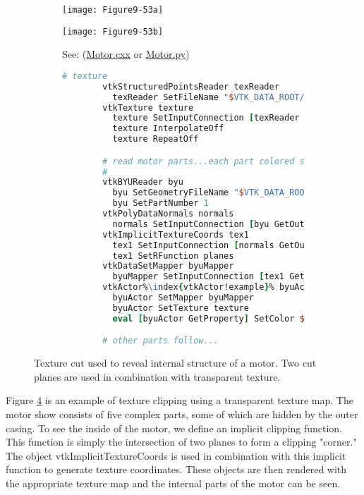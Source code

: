 \begin{figure}[htb]
    \centering
	\begin{subfigure}[h]{0.38\linewidth}
		\texttt{[image: Figure9-53a]}
		\captionsetup{justification=centering}
		\caption*{}
		\label{fig:Figure9-53a}
	\end{subfigure}
	\hfill
	\begin{subfigure}[h]{0.38\linewidth}
		\texttt{[image: Figure9-53b]}
		\captionsetup{justification=centering}
		\caption*{See: (\href{https://lorensen.github.io/VTKExamples/site/Cxx/VisualizationAlgorithms/Motor/}{Motor.cxx} or \href{https://lorensen.github.io/VTKExamples/site/Python/VisualizationAlgorithms/Motor/}{Motor.py})}
        \label{fig:Figure9-53b}
	\end{subfigure}
	\hfill
	\begin{subfigure}[h]{0.76\linewidth}
        \begin{lstlisting}[language=TCL,  caption={}, numbers=none, frame=none, escapechar=\%]
        # texture
        vtkStructuredPointsReader texReader
          texReader SetFileName "$VTK_DATA_ROOT/Data/texThres2.vtk"
        vtkTexture texture
          texture SetInputConnection [texReader GetOutputPort]
          texture InterpolateOff
          texture RepeatOff

        # read motor parts...each part colored separately
        #
        vtkBYUReader byu
          byu SetGeometryFileName "$VTK_DATA_ROOT/Data/motor.g"
          byu SetPartNumber 1
        vtkPolyDataNormals normals
          normals SetInputConnection [byu GetOutputPort]
        vtkImplicitTextureCoords tex1
          tex1 SetInputConnection [normals GetOutputPort]
          tex1 SetRFunction planes
        vtkDataSetMapper byuMapper
          byuMapper SetInputConnection [tex1 GetOutputPort]
        vtkActor%\index{vtkActor!example}% byuActor
          byuActor SetMapper byuMapper
          byuActor SetTexture texture
          eval [byuActor GetProperty] SetColor $cold_grey

        # other parts follow...
        \end{lstlisting}
        \label{fig:Figure9-53d}
	\end{subfigure}
	\caption{Texture cut used to reveal internal structure of a motor. Two cut planes are used in combination with transparent texture.}\label{fig:Figure9-53}
\end{figure}

Figure \ref{fig:Figure9-53} is an example of texture clipping using a transparent texture map. The motor show consists of five complex parts, some of which are hidden by the outer casing. To see the inside of the motor, we define an implicit clipping function. This function is simply the intersection of two planes to form a clipping "corner." The object vtkImplicitTextureCoords is used in combination with this implicit function to generate texture coordinates. These objects are then rendered with the appropriate texture map and the internal parts of the motor can be seen.

